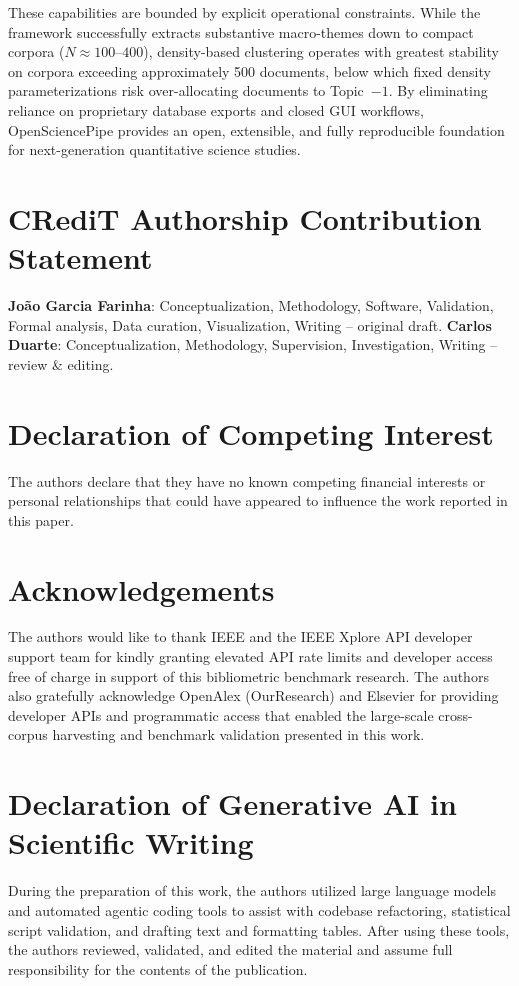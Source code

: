 \documentclass[preprint,12pt]{elsarticle}
\begin{document}
These capabilities are bounded by explicit operational constraints. While the framework successfully extracts substantive macro-themes down to compact corpora ($N \approx 100\text{--}400$), density-based clustering operates with greatest stability on corpora exceeding approximately 500 documents, below which fixed density parameterizations risk over-allocating documents to Topic~$-1$. By eliminating reliance on proprietary database exports and closed GUI workflows, OpenSciencePipe provides an open, extensible, and fully reproducible foundation for next-generation quantitative science studies.

\section*{CRediT Authorship Contribution Statement}
\textbf{João Garcia Farinha}: Conceptualization, Methodology, Software, Validation, Formal analysis, Data curation, Visualization, Writing -- original draft. \textbf{Carlos Duarte}: Conceptualization, Methodology, Supervision, Investigation, Writing -- review \& editing.

\section*{Declaration of Competing Interest}
The authors declare that they have no known competing financial interests or personal relationships that could have appeared to influence the work reported in this paper.

\section*{Acknowledgements}
The authors would like to thank IEEE and the IEEE Xplore API developer support team for kindly granting elevated API rate limits and developer access free of charge in support of this bibliometric benchmark research. The authors also gratefully acknowledge OpenAlex (OurResearch) and Elsevier for providing developer APIs and programmatic access that enabled the large-scale cross-corpus harvesting and benchmark validation presented in this work.

\section*{Declaration of Generative AI in Scientific Writing}
During the preparation of this work, the authors utilized large language models and automated agentic coding tools to assist with codebase refactoring, statistical script validation, and drafting text and formatting tables. After using these tools, the authors reviewed, validated, and edited the material and assume full responsibility for the contents of the publication.
\end{document}
